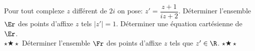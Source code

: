 \begin{exercice}
Pour tout complexe $z$ diff\'erent de $2i$ on pose:
  $z'=\dfrac{z+1}{iz+2}$.
D\'eterminer l'ensemble $\Er$ des points d'affixe $z$ tels
$|z'|=1$. D\'eterminer une \'equation cart\'esienne de $\Er$.\\

$\star\bigstar\star$ D\'eterminer l'ensemble $\Fr$ des points d'affixe
$z$ tels que $z'\in\R$. $\star\bigstar\star$
 
\end{exercice}
